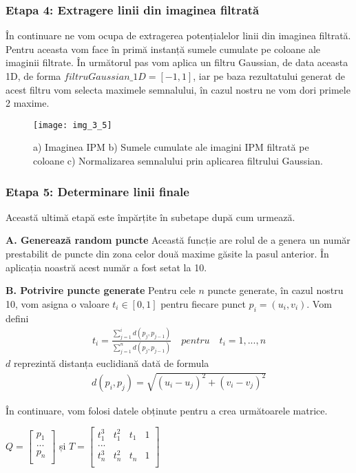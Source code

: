 \subsubsection{Etapa 4: Extragere linii din imaginea filtrată}

În continuare ne vom ocupa de extragerea potențialelor linii din imaginea filtrată. Pentru aceasta vom face în primă instanță sumele cumulate pe coloane ale imaginii filtrate. În următorul pas vom aplica un filtru Gaussian, de data aceasta 1D, de forma $filtruGaussian\_1D = [-1, 1]$, iar pe baza rezultatului generat de acest filtru vom selecta maximele semnalului, în cazul nostru ne vom dori primele 2 maxime.

\begin{figure}[!h]
	\centering
	\texttt{[image: img\_3\_5]}
	\caption[Linii din semnal]{a) Imaginea IPM b) Sumele cumulate ale imagini IPM filtrată pe coloane c) Normalizarea semnalului prin aplicarea filtrului Gaussian.}
\end{figure}

\subsubsection{Etapa 5: Determinare linii finale}

Această ultimă etapă este împărțite în subetape după cum urmează.

\textbf{A. Generează random puncte}
Această funcție are rolul de a genera un număr prestabilit de puncte din zona celor două maxime găsite la pasul anterior. În aplicația noastră acest număr a fost setat la 10.

\textbf{B. Potrivire puncte generate}
Pentru cele $n$ puncte generate, în cazul nostru 10, vom asigna o valoare $t_i \in [0, 1]$ pentru fiecare punct $p_i = (u_i, v_i)$. Vom defini
\begin{align}
	t_i = \frac{\sum_{j = 1}^{i} d(p_j,p_{j-1})}{\sum_{j = 1}^{n} d(p_j,p_{j-1})} \quad pentru \quad t_i = 1, ..., n
\end{align}
$d$ reprezintă distanța euclidiană dată de formula
\begin{align}
	d(p_i,p_j) = \sqrt{(u_i - u_j)^2 + (v_i - v_j)^2}
\end{align}

În continuare, vom folosi datele obținute pentru a crea următoarele matrice.
\begin{center}
	$ Q = 
	\begin{bmatrix}
	p_1 \\
	... \\
	p_n \\
	\end{bmatrix}
	$ și $ T = 
	\begin{bmatrix}
	t_1^3 & t_1^2 & t_1 & 1 \\
	...\\
	t_n^3 & t_n^2 & t_n & 1\\
	\end{bmatrix}
	$
\end{center}

